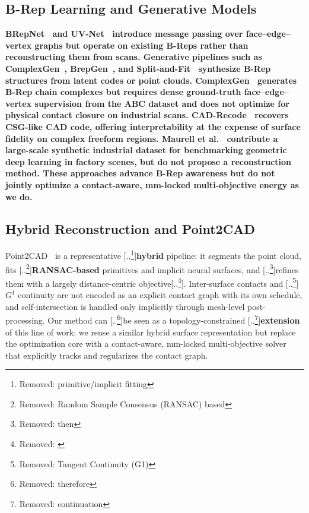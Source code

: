 \documentclass{ieeeaccess}
\providecommand{\DIFaddtex}[1]{{\color{blue}\bfseries #1}} %
\providecommand{\DIFdeltex}[1]{{\color{red}[..\footnote{\color{black}Removed: #1}]}} %
\providecommand{\DIFaddbegin}{} %
\providecommand{\DIFaddend}{} %
\providecommand{\DIFdelbegin}{} %
\providecommand{\DIFdelend}{} %
\providecommand{\DIFadd}[1]{\texorpdfstring{\DIFaddtex{#1}}{#1}} %
\providecommand{\DIFdel}[1]{\texorpdfstring{\DIFdeltex{#1}}{}} %
\begin{document}
\subsection{\DIFadd{B-Rep Learning and Generative Models}}
\DIFadd{BRepNet~\cite{b3} and UV-Net~\cite{b9} introduce message passing over face--edge--vertex graphs but operate on existing B-Reps rather than reconstructing them from scans. Generative pipelines such as ComplexGen~\cite{b1}, BrepGen~\cite{b4}, and Split-and-Fit~\cite{b20} synthesize B-Rep structures from latent codes or point clouds. ComplexGen~\cite{b1} generates B-Rep chain complexes but requires dense ground-truth face--edge--vertex supervision from the ABC dataset and does not optimize for physical contact closure on industrial scans. CAD-Recode~\cite{b24} recovers CSG-like CAD code, offering interpretability at the expense of surface fidelity on complex freeform regions. Maurell et al.~\cite{b31} contribute a large-scale synthetic industrial dataset for benchmarking geometric deep learning in factory scenes, but do not propose a reconstruction method. These approaches advance B-Rep awareness but do not jointly optimize a contact-aware, mm-locked multi-objective energy as we do.
}

\subsection{\DIFadd{Hybrid Reconstruction and Point2CAD}}
\DIFaddend Point2CAD\DIFaddbegin \DIFadd{~\cite{b2} }\DIFaddend is a representative \DIFdelbegin \DIFdel{primitive/implicit fitting }\DIFdelend \DIFaddbegin \DIFadd{hybrid }\DIFaddend pipeline: it segments the point cloud, fits \DIFdelbegin \DIFdel{Random Sample Consensus (RANSAC) based }\DIFdelend \DIFaddbegin \DIFadd{RANSAC-based }\DIFaddend primitives and implicit neural surfaces, and \DIFdelbegin \DIFdel{then }\DIFdelend refines them with a largely distance-centric objective\DIFdelbegin \DIFdel{\cite{b24}}\DIFdelend . Inter-surface contacts and \DIFdelbegin \DIFdel{Tangent Continuity (G1) }\DIFdelend \DIFaddbegin \DIFadd{$G^1$ }\DIFaddend continuity are not encoded as an explicit contact graph with its own schedule, and self-intersection is handled only implicitly through mesh-level post-processing. Our method can \DIFdelbegin \DIFdel{therefore }\DIFdelend be seen as a topology-constrained \DIFdelbegin \DIFdel{continuation }\DIFdelend \DIFaddbegin \DIFadd{extension }\DIFaddend of this line of work: we reuse a similar hybrid surface representation but replace the optimization core with a contact-aware, mm-locked multi-objective solver that explicitly tracks and regularizes the contact graph.
\end{document}
